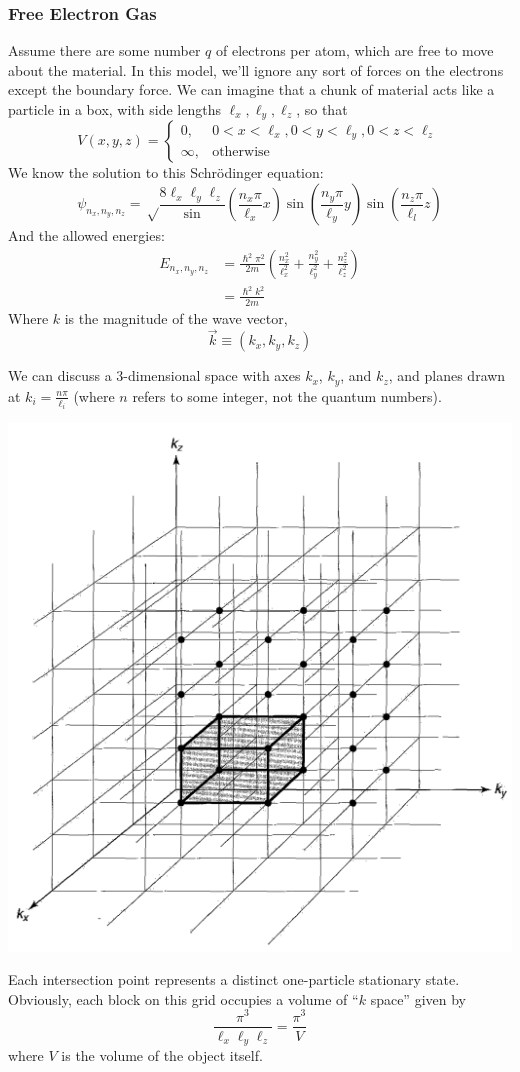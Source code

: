 \documentclass[a4paper]{article}
\begin{document}
\subsubsection{Free Electron Gas}
Assume there are some number $q$ of electrons per atom, which are free to
move about the material. In this model, we'll ignore any sort of forces on the
electrons except the boundary force. We can imagine that a chunk of material
acts like a particle in a box, with side lengths $\ell_x,\ell_y,\ell_z$, so
that
\[ V(x,y,z) =
	\begin{cases}
		0,	&0<x<\ell_x, 0<y<\ell_y, 0<z<\ell_z\\
		\infty, &\text{otherwise}
	\end{cases}
\]
We know the solution to this Schr\"odinger equation:
\[
	\psi_{n_x,n_y,n_z} =
		\sqrt\frac{{8}{\ell_x}{\ell_y}{\ell_z}}
		\sin\left(\frac{n_x\pi}{\ell_x}x\right)
		\sin\left(\frac{n_y\pi}{\ell_y}y\right)
		\sin\left(\frac{n_z\pi}{\ell_l}z\right)
\]
And the allowed energies:
\begin{align*}
	E_{n_x,n_y,n_z} &=
		\frac{\hslash^2\pi^2}{2m} \left(
			\frac{n_x^2}{\ell_x^2} +
			\frac{n_y^2}{\ell_y^2} +
			\frac{n_z^2}{\ell_z^2}
		\right)\\
		&= \frac{\hslash^2 k^2}{2m}
\end{align*}
Where $k$ is the magnitude of the wave vector,
\[ \vec{k} \equiv (k_x,k_y,k_z) \]

We can discuss a 3-dimensional space with axes $k_x$, $k_y$, and $k_z$, and
planes drawn at $k_i = \frac{n\pi}{\ell_i}$ (where $n$ refers to some
integer, not the quantum numbers).
\begin{center}
	\includegraphics[width=0.75\linewidth]{grid.png}
\end{center}
Each intersection point represents a distinct one-particle stationary state.
Obviously, each block on this grid occupies a volume of ``$k$ space'' given
by
\[ \frac{\pi^3}{\ell_x\ell_y\ell_z} = \frac{\pi^3}{V} \]
where $V$ is the volume of the object itself.
\end{document}
